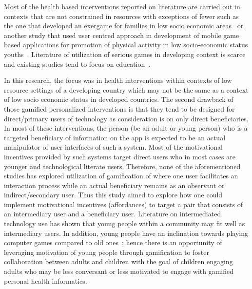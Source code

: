 Most of the health based interventions reported on literature are carried out in contexts that are not constrained in resources with exceptions of fewer such as the one that developed an exergame for families in low socio economic areas~\citep{saksono2015spaceship} or another study that used user centred approach in development of mobile game based applications for promotion of physical activity in low socio-economic status youths~\citep{blackman2016developing}. Literature of utilization of serious games in developing context is scarce and existing studies tend to focus on education~\citep{kam2008designing,botha2015icts}.

In this research, the focus was in health interventions within contexts of low resource settings of a developing country which may not be the same as a context of low socio economic status in developed countries. The second drawback of those gamified personalized interventions is that they tend to be designed for direct/primary users of technology as consideration is on only direct beneficiaries. In most of these interventions, the person (be an adult or young person) who is a targeted beneficiary of information on the app is expected to be an actual manipulator of user interfaces of such a system. Most of the motivational incentives provided by such systems target direct users who in most cases are younger and technological literate users. Therefore, none of the aforementioned studies has explored utilization of gamification of where one user facilitates an interaction process while an actual beneficiary remains as an observant or indirect/secondary user. Thus this study aimed to explore how one could implement motivational incentives (affordances) to target a pair that consists of an intermediary user and a beneficiary user. Literature on intermediated technology use has shown that young people within a community may fit well as intermediary users. In addition, young people have an inclination towards playing computer games compared to old ones~\citep{brauner2013increase}; hence there is an opportunity of leveraging  motivation of young people through gamification to foster collaboration between adults and children with the goal of children engaging adults who may be less conversant or less motivated to engage with gamified personal health informatics. 

\begin{flushright}
\end{flushright}
